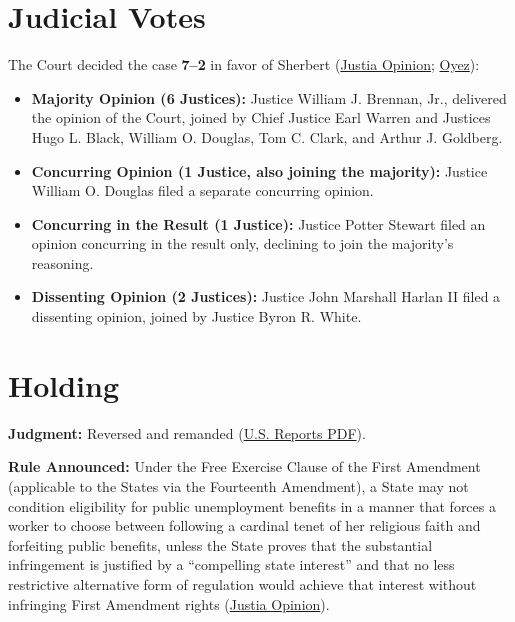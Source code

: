 \documentclass[12pt]{article}
\begin{document}
\section{Judicial Votes}

The Court decided the case \textbf{7--2} in favor of Sherbert (\href{https://supreme.justia.com/cases/federal/us/374/398/}{Justia Opinion}; \href{https://www.oyez.org/cases/1962/526}{Oyez}):
\begin{itemize}
\item \textbf{Majority Opinion (6 Justices):} Justice William J. Brennan, Jr., delivered the opinion of the Court, joined by Chief Justice Earl Warren and Justices Hugo L. Black, William O. Douglas, Tom C. Clark, and Arthur J. Goldberg.
\item \textbf{Concurring Opinion (1 Justice, also joining the majority):} Justice William O. Douglas filed a separate concurring opinion.
\item \textbf{Concurring in the Result (1 Justice):} Justice Potter Stewart filed an opinion concurring in the result only, declining to join the majority's reasoning.
\item \textbf{Dissenting Opinion (2 Justices):} Justice John Marshall Harlan II filed a dissenting opinion, joined by Justice Byron R. White.
\end{itemize}

\section{Holding}

\textbf{Judgment:} Reversed and remanded (\href{https://tile.loc.gov/storage-services/service/ll/usrep/usrep374/usrep374398/usrep374398.pdf}{U.S. Reports PDF}).

\textbf{Rule Announced:} Under the Free Exercise Clause of the First Amendment (applicable to the States via the Fourteenth Amendment), a State may not condition eligibility for public unemployment benefits in a manner that forces a worker to choose between following a cardinal tenet of her religious faith and forfeiting public benefits, unless the State proves that the substantial infringement is justified by a ``compelling state interest'' and that no less restrictive alternative form of regulation would achieve that interest without infringing First Amendment rights (\href{https://supreme.justia.com/cases/federal/us/374/398/}{Justia Opinion}).
\end{document}

